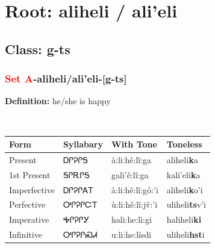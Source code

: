 \needspace{4in}
\section*{Root: aliheli / ali'eli}
\nopagebreak
{}
\needspace{3in}
\subsection*{Class: g-ts}
\nopagebreak
\needspace{2in}
\subsubsection*{\textcolor{Red}{Set A}{-}\textbf{aliheli/ali'eli}{-}[g-ts]}
\nopagebreak
\textbf{Definition: } he/she is happy
\\[0.5em]
\begin{tabularx}{\textwidth}{l X X X}%
\toprule%
\textbf{Form}&\textbf{Syllabary}&\textbf{With Tone}&\textbf{Toneless}\\%
\midrule%
Present&ᎠᎵᎮᎵᎦ&à:li:hě:lî:ga&aliheli\textbf{k}a\\%
1st Present&ᎦᎵᎡᎵᎦ&gali’ě:lî:ga&kali'eli\textbf{k}a\\%
Imperfective&ᎠᎵᎮᎵᎪᎢ&à:li:hě:lî:gó:’i&aliheli\textbf{k}o'i\\%
Perfective&ᎤᎵᎮᎵᏨᎢ&ù:li:hě:lî:jv̌:’i&uliheli\textbf{ts}v'i\\%
Imperative&ᎭᎵᎮᎵᎩ&hali:he:lì:gi&haliheli\textbf{ki}\\%
Infinitive&ᎤᎵᎮᎵᏍᏗ&u:li:he:lísdi&uliheli\textbf{hst}i\\%
\bottomrule%
\end{tabularx}
\\[1em]